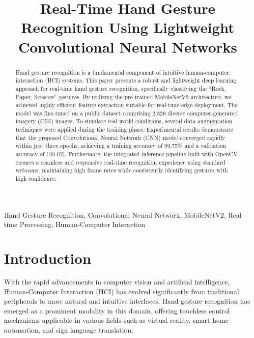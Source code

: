 \documentclass[conference]{IEEEtran}
\begin{document}
\title{Real-Time Hand Gesture Recognition Using Lightweight Convolutional Neural Networks\\
}

\author{
}

\maketitle

\begin{abstract}
Hand gesture recognition is a fundamental component of intuitive human-computer interaction (HCI) systems. This paper presents a robust and lightweight deep learning approach for real-time hand gesture recognition, specifically classifying the ``Rock, Paper, Scissors'' gestures. By utilizing the pre-trained MobileNetV2 architecture, we achieved highly efficient feature extraction suitable for real-time edge deployment. The model was fine-tuned on a public dataset comprising 2,520 diverse computer-generated imagery (CGI) images. To simulate real-world conditions, several data augmentation techniques were applied during the training phase. Experimental results demonstrate that the proposed Convolutional Neural Network (CNN) model converged rapidly within just three epochs, achieving a training accuracy of 99.75\% and a validation accuracy of 100.0\%. Furthermore, the integrated inference pipeline built with OpenCV ensures a seamless and responsive real-time recognition experience using standard webcams, maintaining high frame rates while consistently identifying gestures with high confidence.
\end{abstract}

\begin{IEEEkeywords}
Hand Gesture Recognition, Convolutional Neural Network, MobileNetV2, Real-time Processing, Human-Computer Interaction
\end{IEEEkeywords}

\section{Introduction}
With the rapid advancements in computer vision and artificial intelligence, Human-Computer Interaction (HCI) has evolved significantly from traditional peripherals to more natural and intuitive interfaces. Hand gesture recognition has emerged as a prominent modality in this domain, offering touchless control mechanisms applicable in various fields such as virtual reality, smart home automation, and sign language translation.
\end{document}
